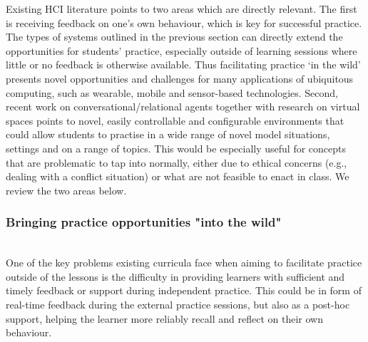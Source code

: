 \documentclass[prodmode,acmtochi]{acmsmall}
\newcommand{\GeraldineFIX}[1]{}
\begin{document}
Existing HCI literature points to two areas which are directly relevant. The first is receiving feedback on one's own behaviour, which is key for successful practice. The types of systems outlined in the previous section can directly extend the opportunities for students' practice, especially outside of learning sessions where little or no feedback is otherwise available. Thus facilitating practice `in the wild'  presents novel opportunities and challenges  for many applications of ubiquitous computing, such as wearable, mobile and sensor-based technologies. Second, recent work on conversational/relational agents together with research on virtual spaces  points to novel, easily controllable and configurable environments that could allow students to practise in a wide range of novel model situations, settings and on a range of topics. This would be especially useful for concepts that are problematic to tap into normally, either due to ethical concerns (e.g., dealing with a conflict situation) or what are not feasible to enact in class. We review the two areas below.  %

\GeraldineFIX{ G: 'ubiq' is too generic .. do you need to say eg using mobile, wearble, sensor-based or whatever ??? pint it down more specifically? tech bits are all a bit too glossed over perhaps?\\
P: Glossing over is a problem I know about -- my issue is that, as usual, it is hard for me to pick a few detailed aspects to highlight, when it feels that basically any technology you can think of has use in this settings (if you find a good place in a curricula so that it fits well etc...) Any tips appreciated :) }

\subsubsection{Bringing practice opportunities "into the wild"}~\\ 
\GeraldineFIX{ G: use the language of 'into the wild' as a parallel type of situation to make links to current chi issues clearer... P: Not sure what this means?}
One of the key problems  existing curricula face when aiming to facilitate practice outside of the lessons is the difficulty in providing learners with sufficient and timely feedback or support during independent practice. This could be in form of real-time feedback during the external practice sessions, but also as a post-hoc support, helping the learner more reliably recall and reflect on their own behaviour. 
\end{document}
